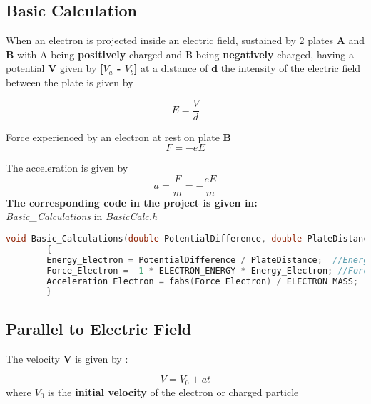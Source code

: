 \documentclass[a4paper,20pt,twoside]{report}
\begin{document}
	\subsection{Basic Calculation}
		When an electron is projected inside an electric field, sustained by 2 plates
		\textbf{A} and \textbf{B}
		with A being 
		\textbf{positively}
		charged and B being
		\textbf{negatively}
	    charged, having a potential
		\textbf{V}
		 given by
		\textbf{[$V_a$ - $V_b$]}
		at a distance of \textbf{d}
		 the intensity of the electric field between the plate is given by
		
		\begin{equation}
		E = \frac{V}{d}
		\end{equation}
		
		
		Force experienced by an electron at rest on plate
		\textbf{B}
		\begin{equation}
		F = -eE
		\end{equation}
		
		\textnormal{The acceleration is given by}
		\begin{equation}
		a = \frac{F}{m} = -\frac{eE}{m}
		\end{equation}
		\vspace{10mm}
		\textbf{The corresponding code in the project is given in:\\}
		\vspace{2mm}
		\textit{Basic\_Calculations} \textnormal{in }\textit{BasicCalc.h}
		\vspace{2mm}
		
		\begin{lstlisting}[language = C]
		void Basic_Calculations(double PotentialDifference, double PlateDistance)
		{
		Energy_Electron = PotentialDifference / PlateDistance;  //Energy of the electron
		Force_Electron = -1 * ELECTRON_ENERGY * Energy_Electron; //Force on electron at Plate B
		Acceleration_Electron = fabs(Force_Electron) / ELECTRON_MASS;  //Acceleration of Electron
		}
		\end{lstlisting}
		
		
		\subsection{Parallel to Electric Field}
			The velocity  \textbf{V} is given by :
			
			\begin{equation}
			V = V_0 + at
			\end{equation}
			where $V_0$ is the \textbf{initial velocity} of the electron or charged particle
			
\end{document}
